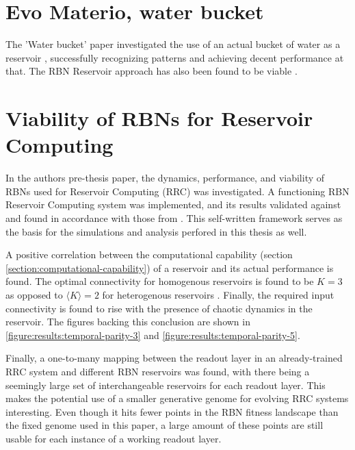 \section{Evo Materio, water bucket}

The 'Water bucket' paper investigated the use of an actual bucket of water as a reservoir \cite{fernando2003pattern},
successfully recognizing patterns and achieving decent performance at that.
The RBN Reservoir approach has also been found to be viable \cite{rbn-reservoir} .


\section{Viability of RBNs for Reservoir Computing}
\label{section:pre-thesis-project}

In the authors pre-thesis paper, the dynamics, performance, and viability of RBNs used for Reservoir Computing (RRC) was investigated.
A functioning RBN Reservoir Computing system was implemented,
and its results validated against and found in accordance with those from \cite{rbn-reservoir}.
This self-written framework serves as the basis for the simulations and analysis perfored in this thesis as well.

A positive correlation between the computational capability (section \ref{section:computational-capability}) of a reservoir and its actual performance is found.
The optimal connectivity for homogenous reservoirs is found to be $K=3$ as opposed to $\langle K \rangle = 2$ for heterogenous reservoirs \cite{rbn-reservoir}.
Finally, the required input connectivity is found to rise with the presence of chaotic dynamics in the reservoir.
The figures backing this conclusion are shown in \ref{figure:results:temporal-parity-3} and \ref{figure:results:temporal-parity-5}.

Finally, a one-to-many mapping between the readout layer in an already-trained RRC system and different RBN reservoirs was found,
with there being a seemingly large set of interchangeable reservoirs for each readout layer.
This makes the potential use of a smaller generative genome for evolving RRC systems interesting.
Even though it hits fewer points in the RBN fitness landscape than the fixed genome used in this paper,
a large amount of these points are still usable for each instance of a working readout layer.

